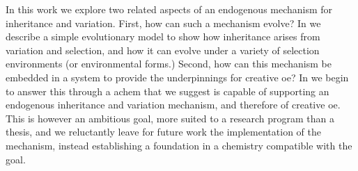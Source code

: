 In this work we explore two related aspects of an endogenous mechanism for inheritance and variation. First, how can such a mechanism evolve? In  we describe a simple evolutionary model to show how inheritance arises from variation and selection, and how it can evolve under a variety of selection environments (or environmental forms.) Second, how can this mechanism be embedded in a system to provide the underpinnings for creative \gls{oe}? In  we begin to answer this through a \gls{achem} that we suggest is capable of supporting an endogenous inheritance and variation mechanism, and therefore of creative \gls{oe}. This is however an ambitious goal, more suited to a research program than a thesis, and we reluctantly leave for future work the implementation of the mechanism, instead establishing a foundation in a chemistry compatible with the goal.

